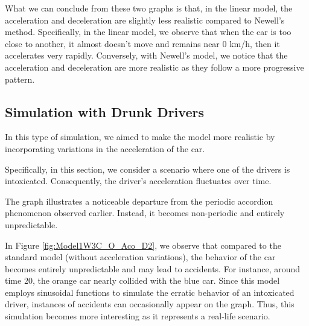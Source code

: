 \documentclass{article}
\begin{document}
		What we can conclude from these two graphs is that, in the linear model, the acceleration and deceleration are slightly less realistic compared to Newell's method. Specifically, in the linear model, we observe that when the car is too close to another, it almost doesn't move and remains near 0 km/h, then it accelerates very rapidly. Conversely, with Newell's model, we notice that the acceleration and deceleration are more realistic as they follow a more progressive pattern.
		
		\subsection{Simulation with Drunk Drivers}
		
		In this type of simulation, we aimed to make the model more realistic by incorporating variations in the acceleration of the car.
		
		Specifically, in this section, we consider a scenario where one of the drivers is intoxicated. Consequently, the driver's acceleration fluctuates over time.
		
		The graph illustrates a noticeable departure from the periodic accordion phenomenon observed earlier. Instead, it becomes non-periodic and entirely unpredictable.
		
		In Figure \ref{fig:Model1W3C_O_Aco_D2}, we observe that compared to the standard model (without acceleration variations), the behavior of the car becomes entirely unpredictable and may lead to accidents. For instance, around time 20, the orange car nearly collided with the blue car. Since this model employs sinusoidal functions to simulate the erratic behavior of an intoxicated driver, instances of accidents can occasionally appear on the graph. Thus, this simulation becomes more interesting as it represents a real-life scenario.
		
\end{document}
